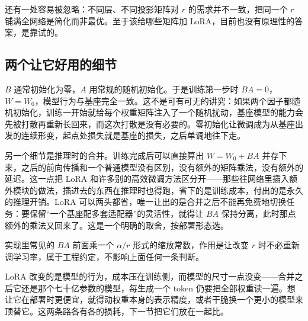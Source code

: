 还有一处容易被忽略：不同层、不同投影矩阵对 \(r\) 的需求并不一致，把同一个 \(r\) 铺满全网络是简化而非最优。至于该给哪些矩阵加 LoRA，目前也没有原理性的答案，是靠试的。

\subsection{两个让它好用的细节}

\(B\) 通常初始化为零，\(A\) 用常规的随机初始化。于是训练第一步时 \(BA = 0\)，\(W = W_0\)，模型行为与基座完全一致。这不是可有可无的讲究：如果两个因子都随机初始化，训练一开始就给每个权重矩阵注入了一个随机扰动，基座模型的能力会先被打散再重新长回来，而这次打散是没有必要的。零初始化让微调成为从基座出发的连续形变，起点处损失就是基座的损失，之后单调地往下走。

另一个细节是推理时的合并。训练完成后可以直接算出 \(W = W_0 + BA\) 并存下来，之后的前向传播和一个普通模型没有区别，没有额外的矩阵乘法，没有额外的延迟。这一点把 LoRA 和许多别的高效微调方法区分开——那些往网络里插入额外模块的做法，插进去的东西在推理时也得跑，省下的是训练成本，付出的是永久的推理开销。LoRA 可以两头都省，唯一让出的是合并之后不能再免费地切换任务：要保留``一个基座配多套适配器''的灵活性，就得让 \(BA\) 保持分离，此时那点额外的乘法又回来了。这是一个明确的取舍，按部署形态选。

实现里常见的 \(BA\) 前面乘一个 \(\alpha / r\) 形式的缩放常数，作用是让改变 \(r\) 时不必重新调学习率，属于工程约定，不影响上面任何一条判断。

\medskip

LoRA 改变的是模型的行为，成本压在训练侧，而模型的尺寸一点没变——合并之后它还是那个七十亿参数的模型，每生成一个 token 仍要把全部权重读一遍。想让它在部署时更便宜，就得动权重本身的表示精度，或者干脆换一个更小的模型来顶替它。这两条路各有各的损耗，下一节把它们放在一起比。
